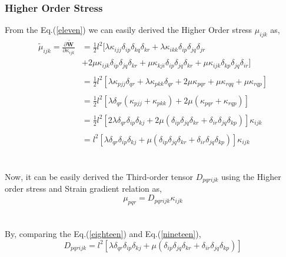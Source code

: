 \documentclass[12pt]{article}
\begin{document}
\subsubsection { Higher Order Stress  }
From the Eq.(\ref{eleven}) we can easily derived the Higher Order stress $\mu_{ijk}$ as,
\begin{equation}\label{eighteen}
\begin{aligned}
\tilde{\mu}_{ijk} =  \frac{\partial \tilde{\mathbf{W}} }{\partial \kappa_{ijk}} &= \frac{1}{2}l^2[\lambda \kappa_{ijj}\delta_{ip} \delta_{kq} \delta_{kr} + \lambda \kappa_{ikk}\delta_{ip} \delta_{jq} \delta_{jr} \\
& + 2\mu \kappa_{ijk}\delta_{ip} \delta_{jq} \delta_{kr}  + \mu \kappa_{kji}\delta_{ip} \delta_{jq} \delta_{kr} + \mu \kappa_{ijk}\delta_{kp} \delta_{jq} \delta_{ir} ] \\
\\
&= \frac{1}{2}l^2 [ \lambda \kappa_{pjj}\delta_{qr} + \lambda \kappa_{pkk}\delta_{qr}  +2\mu \kappa_{pqr} + \mu\kappa_{rqq} + \mu\kappa_{rqp}   ] \\ 
\\
&= \frac{1}{2}l^2 [ \lambda\delta_{qr} (\kappa_{pjj}+\kappa_{pkk})   + 2\mu (\kappa_{pqr} + \kappa_{rqp}) ] \\
\\
&= \frac{1}{2}l^2 [ 2\lambda \delta_{qr} \delta_{ip} \delta_{kj} + 2\mu(\delta_{ip} \delta_{jq} \delta_{kr} + \delta_{ir} \delta_{jq} \delta_{kp})  ] \kappa_{ijk}
\\
\\
&= l^2 [ \lambda \delta_{qr} \delta_{ip} \delta_{kj} + \mu(\delta_{ip} \delta_{jq} \delta_{kr} + \delta_{ir} \delta_{jq} \delta_{kp}) ] \kappa_{ijk}
\end{aligned}
\end{equation}
\\
\\
Now, it can be easily derived the Third-order tensor $D_{pqrijk}$ using the Higher order stress and Strain gradient relation as,
\begin{equation}\label{nineteen}
\mu_{pqr} = D_{pqrijk} \kappa_{ijk}
\end{equation}
\\
\\
By, comparing the Eq.(\ref{eighteen}) and Eq.(\ref{nineteen}),
\begin{equation}\label{twenty}
D_{pqrijk} = l^2 [ \lambda \delta_{qr} \delta_{ip} \delta_{kj} + \mu(\delta_{ip} \delta_{jq} \delta_{kr} + \delta_{ir} \delta_{jq} \delta_{kp}) ]
\end{equation}
\end{document}
